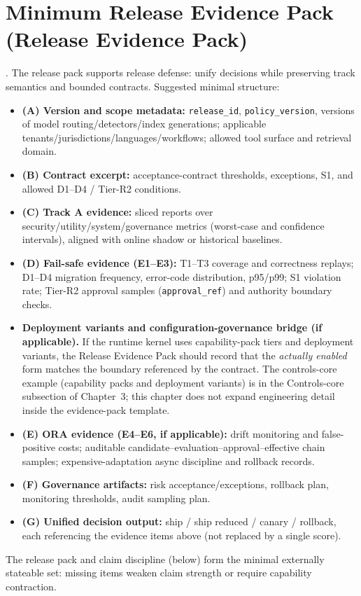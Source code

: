 \documentclass[11pt,a4paper]{report}
\begin{document}
\section{Minimum Release Evidence Pack (Release Evidence Pack)}
\EvalFramework{}. The release pack supports release defense: unify decisions while preserving track semantics and bounded contracts. Suggested minimal structure:
\begin{itemize}
  \item \textbf{(A) Version and scope metadata:} \texttt{release\_id}, \texttt{policy\_version}, versions of model routing/detectors/index generations; applicable tenants/jurisdictions/languages/workflows; allowed tool surface and retrieval domain.
  \item \textbf{(B) Contract excerpt:} acceptance-contract thresholds, exceptions, S1, and allowed D1--D4 / Tier-R2 conditions.
  \item \textbf{(C) Track A evidence:} sliced reports over security/utility/system/governance metrics (worst-case and confidence intervals), aligned with online shadow or historical baselines.
  \item \textbf{(D) Fail-safe evidence (E1--E3):} T1--T3 coverage and correctness replays; D1--D4 migration frequency, error-code distribution, p95/p99; S1 violation rate; Tier-R2 approval samples (\texttt{approval\_ref}) and authority boundary checks.
  \item[] \textbf{Deployment variants and configuration-governance bridge (if applicable).} If the runtime kernel uses capability-pack tiers and deployment variants, the Release Evidence Pack should record that the \emph{actually enabled} form matches the boundary referenced by the contract. The controls-core example (capability packs and deployment variants) is in the Controls-core subsection of Chapter~3; this chapter does not expand engineering detail inside the evidence-pack template.
  \item \textbf{(E) ORA evidence (E4--E6, if applicable):} drift monitoring and false-positive costs; auditable candidate–evaluation–approval–effective chain samples; expensive-adaptation async discipline and rollback records.
  \item \textbf{(F) Governance artifacts:} risk acceptance/exceptions, rollback plan, monitoring thresholds, audit sampling plan.
  \item \textbf{(G) Unified decision output:} ship / ship reduced / canary / rollback, each referencing the evidence items above (not replaced by a single score).
\end{itemize}
\noindent The release pack and claim discipline (below) form the minimal externally stateable set: missing items weaken claim strength or require capability contraction.
\end{document}
